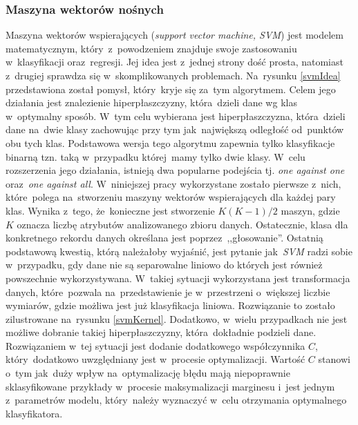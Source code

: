 \subsubsection{Maszyna wektorów nośnych}
Maszyna wektorów wspierających (\textit{support vector machine, SVM}) jest modelem matematycznym, który~z~powodzeniem znajduje swoje zastosowaniu w~klasyfikacji oraz~regresji. Jej idea jest z~jednej strony dość prosta, natomiast z~drugiej sprawdza się w~skomplikowanych problemach\cite{svm1}. Na~rysunku \ref{svmIdea} przedstawiona został pomysł, który~kryje się za~tym algorytmem. Celem jego działania jest znalezienie hiperpłaszczyzny, która~dzieli dane wg klas w~optymalny sposób. W~tym celu wybierana jest hiperpłaszczyzna, która~dzieli dane na~dwie klasy zachowując przy tym jak~największą odległość od~punktów obu tych klas\cite{svm2}. Podstawowa wersja tego algorytmu zapewnia tylko klasyfikacje binarną tzn. taką w~przypadku której~mamy tylko dwie klasy. W~celu rozszerzenia jego działania, istnieją dwa popularne podejścia  tj. \textit{one against one} oraz~\textit{one against all}\cite{svm3}. W~niniejszej pracy wykorzystane zostało pierwsze z~nich, które~polega na~stworzeniu maszyny wektorów wspierających dla każdej pary klas. Wynika z~tego, że~konieczne jest stworzenie $K(K-1)/2$ maszyn, gdzie ~$K$ oznacza liczbę atrybutów analizowanego zbioru danych. Ostatecznie, klasa dla konkretnego rekordu danych określana jest poprzez~,,głosowanie''. Ostatnią podstawową kwestią, którą należałoby wyjaśnić, jest pytanie jak~\textit{SVM} radzi sobie w~przypadku, gdy dane nie są separowalne liniowo do których jest również powszechnie wykorzystywana. W~takiej sytuacji wykorzystana jest transformacja danych, które~pozwala na~przedstawienie je w~przestrzeni o~większej liczbie wymiarów, gdzie możliwa jest już klasyfikacja liniowa. Rozwiązanie to zostało zilustrowane na~rysunku \ref{svmKernel}. Dodatkowo, w~wielu przypadkach nie jest możliwe dobranie takiej hiperpłaszczyzny, która~dokładnie podzieli dane. Rozwiązaniem w~tej sytuacji jest dodanie dodatkowego współczynnika $C$, który~dodatkowo uwzględniany jest w~procesie optymalizacji. Wartość $C$ stanowi o~tym jak~duży wpływ na~optymalizację błędu mają niepoprawnie sklasyfikowane przykłady w~procesie maksymalizacji marginesu i~jest jednym z~parametrów modelu, który~należy wyznaczyć w~celu otrzymania optymalnego klasyfikatora. 

